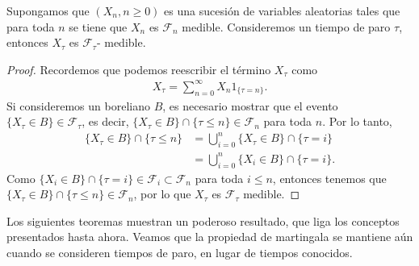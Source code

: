 \begin{proposition}
\label{medible}
	Supongamos que $(X_n, n \geq 0)$ es una sucesión de variables aleatorias tales que para toda $n$ se tiene que $X_n$ es $\mathcal{F}_n$ medible. Consideremos un tiempo de paro $\tau$, entonces $X_{\tau}$ es $\mathcal{F}_{\tau}$- medible.
\end{proposition}
\begin{proof}
	Recordemos que podemos reescribir el término $X_{\tau}$ como
	\begin{align*}
		X_{\tau} = \sum_{n=0}^{\infty} X_n  1_{ \{\tau = n\} }.
	\end{align*}
	Si consideremos un boreliano $B$, es necesario mostrar que el evento $\{ X_{\tau} \in B \} \in \mathcal{F}_{\tau}$, es decir, $\{ X_{\tau} \in B \} \cap \{ \tau \leq n\} \in \mathcal{F}_{n}$ para toda $n$. Por lo tanto,
	\begin{align*}
		\{ X_{\tau} \in B \} \cap \{ \tau \leq n\} & = \bigcup_{i=0}^{n} \{ X_{\tau} \in B \} \cap \{ \tau = i\} \\
		& = \bigcup_{i=0}^{n} \{ X_{i} \in B \} \cap \{ \tau = i\}.
	\end{align*}
	Como $\{ X_{i} \in B \} \cap \{ \tau = i\} \in \mathcal{F}_i \subset \mathcal{F}_n$ para toda $i \leq n$, entonces tenemos que $\{ X_{\tau} \in B \} \cap \{ \tau \leq n\} \in \mathcal{F}_{n}$, por lo que $X_{\tau}$ es $\mathcal{F}_{\tau}$ medible.
\end{proof}

Los siguientes teoremas muestran un poderoso resultado, que liga los conceptos presentados hasta ahora. Veamos que la propiedad de martingala se mantiene aún cuando se consideren tiempos de paro, en lugar de tiempos conocidos.

